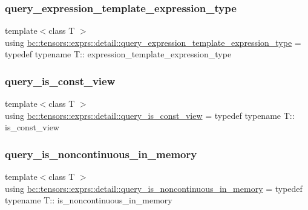 \subsubsection{\texorpdfstring{query\+\_\+expression\+\_\+template\+\_\+expression\+\_\+type}{query\_expression\_template\_expression\_type}}
{\footnotesize\ttfamily template$<$class T $>$ \\
using \hyperlink{namespacebc_1_1tensors_1_1exprs_1_1detail_a8daec353fcf1440e3e610f412a2228d8}{bc\+::tensors\+::exprs\+::detail\+::query\+\_\+expression\+\_\+template\+\_\+expression\+\_\+type} = typedef typename T\+:: expression\+\_\+template\+\_\+expression\+\_\+type}

\mbox{\label{namespacebc_1_1tensors_1_1exprs_1_1detail_a701fb55d84ce81a94fc5552092b64138}} 
\subsubsection{\texorpdfstring{query\+\_\+is\+\_\+const\+\_\+view}{query\_is\_const\_view}}
{\footnotesize\ttfamily template$<$class T $>$ \\
using \hyperlink{namespacebc_1_1tensors_1_1exprs_1_1detail_a701fb55d84ce81a94fc5552092b64138}{bc\+::tensors\+::exprs\+::detail\+::query\+\_\+is\+\_\+const\+\_\+view} = typedef typename T\+:: is\+\_\+const\+\_\+view}

\mbox{\label{namespacebc_1_1tensors_1_1exprs_1_1detail_aa6d73fadec8691f52ebcd7254c6ec9bb}} 
\subsubsection{\texorpdfstring{query\+\_\+is\+\_\+noncontinuous\+\_\+in\+\_\+memory}{query\_is\_noncontinuous\_in\_memory}}
{\footnotesize\ttfamily template$<$class T $>$ \\
using \hyperlink{namespacebc_1_1tensors_1_1exprs_1_1detail_aa6d73fadec8691f52ebcd7254c6ec9bb}{bc\+::tensors\+::exprs\+::detail\+::query\+\_\+is\+\_\+noncontinuous\+\_\+in\+\_\+memory} = typedef typename T\+:: is\+\_\+noncontinuous\+\_\+in\+\_\+memory}

